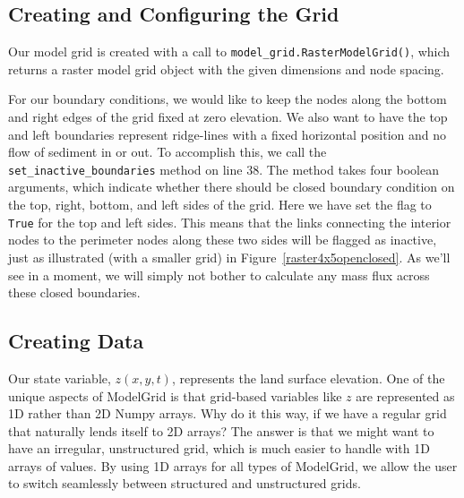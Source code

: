 \documentclass[12pt]{article}
\newcommand{\code}[1]{{\tt #1}}
\begin{document}
\subsection{Creating and Configuring the Grid}



Our model grid is created with a call to \code{model\_grid.RasterModelGrid()}, which returns a raster model grid object with the given dimensions and node spacing. %

For our boundary conditions, we would like to keep the nodes along the bottom and right edges of the grid fixed at zero elevation. We also want to have the top and left boundaries represent ridge-lines with a fixed horizontal position and no flow of sediment in or out. To accomplish this, we call the \code{set\_inactive\_boundaries} method on line 38. The method takes four boolean arguments, which indicate whether there should be closed boundary condition on the top, right, bottom, and left sides of the grid. Here we have set the flag to \code{True} for the top and left sides. This means that the links connecting the interior nodes to the perimeter nodes along these two sides will be flagged as inactive, just as illustrated (with a smaller grid) in Figure~\ref{raster4x5openclosed}. As we'll see in a moment, we will simply not bother to calculate any mass flux across these closed boundaries.


\subsection{Creating Data}



Our state variable, $z(x,y,t)$, represents the land surface elevation. One of the unique aspects of ModelGrid is that grid-based variables like $z$ are represented as 1D rather than 2D Numpy arrays. Why do it this way, if we have a regular grid that naturally lends itself to 2D arrays? The answer is that we might want to have an irregular, unstructured grid, which is much easier to handle with 1D arrays of values. By using 1D arrays for all types of ModelGrid, we allow the user to switch seamlessly between structured and unstructured grids.
\end{document}
